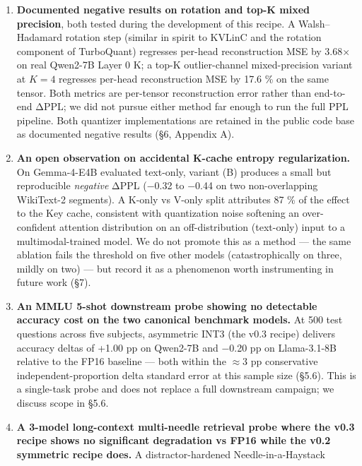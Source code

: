 \documentclass[
]{article}
\begin{document}
\begin{enumerate}
  a structural ingredient for per-channel KV quantization specifically
  because V-cache reconstruction error bypasses the softmax
  normalization that partially absorbs K-cache error, rather than a
  generic quality-of-life preprocessing step (§5.3).
\item
  \textbf{Documented negative results on rotation and top-K mixed
  precision}, both tested during the development of this recipe. A
  Walsh--Hadamard rotation step (similar in spirit to KVLinC and the
  rotation component of TurboQuant) regresses per-head reconstruction
  MSE by 3.68× on real Qwen2-7B Layer 0 K; a top-K outlier-channel
  mixed-precision variant at \(K = 4\) regresses per-head reconstruction
  MSE by 17.6 \% on the same tensor. Both metrics are per-tensor
  reconstruction error rather than end-to-end ΔPPL; we did not pursue
  either method far enough to run the full PPL pipeline. Both quantizer
  implementations are retained in the public code base as documented
  negative results (§6, Appendix A).
\item
  \textbf{An open observation on accidental K-cache entropy
  regularization.} On Gemma-4-E4B evaluated text-only, variant (B)
  produces a small but reproducible \emph{negative} ΔPPL (−0.32 to −0.44
  on two non-overlapping WikiText-2 segments). A K-only vs V-only split
  attributes 87 \% of the effect to the Key cache, consistent with
  quantization noise softening an over-confident attention distribution
  on an off-distribution (text-only) input to a multimodal-trained
  model. We do not promote this as a method --- the same ablation fails
  the threshold on five other models (catastrophically on three, mildly
  on two) --- but record it as a phenomenon worth instrumenting in
  future work (§7).
\item
  \textbf{An MMLU 5-shot downstream probe showing no detectable accuracy
  cost on the two canonical benchmark models.} At 500 test questions
  across five subjects, asymmetric INT3 (the v0.3 recipe) delivers
  accuracy deltas of +1.00 pp on Qwen2-7B and −0.20 pp on Llama-3.1-8B
  relative to the FP16 baseline --- both within the \(\approx 3\) pp
  conservative independent-proportion delta standard error at this
  sample size (§5.6). This is a single-task probe and does not replace a
  full downstream campaign; we discuss scope in §5.6.
\item
  \textbf{A 3-model long-context multi-needle retrieval probe where the
  v0.3 recipe shows no significant degradation vs FP16 while the v0.2
  symmetric recipe does.} A distractor-hardened Needle-in-a-Haystack

\end{enumerate}
\end{document}

